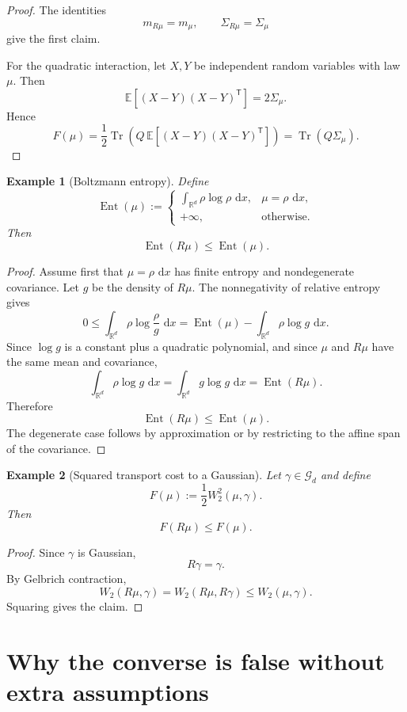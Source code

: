 \documentclass[11pt]{article}
\newtheorem{example}{Example}
\DeclareMathOperator{\Tr}{Tr}
\DeclareMathOperator{\Ent}{Ent}
\newcommand{\R}{\mathbb R}
\newcommand{\W}{W}
\newcommand{\dd}{\,\mathrm d}
\begin{document}
\begin{proof}
The identities
\[
m_{R\mu}=m_\mu,
\qquad
\Sigma_{R\mu}=\Sigma_\mu
\]
give the first claim.

For the quadratic interaction, let $X,Y$ be independent random variables with
law $\mu$. Then
\[
\mathbb E[(X-Y)(X-Y)^{\mathsf T}]=2\Sigma_\mu.
\]
Hence
\[
F(\mu)
=
\frac12\Tr\!\left(Q\,\mathbb E[(X-Y)(X-Y)^{\mathsf T}]\right)
=
\Tr(Q\Sigma_\mu).
\]
\end{proof}

\begin{example}[Boltzmann entropy]
Define
\[
\Ent(\mu)
:=
\begin{cases}
\displaystyle \int_{\R^d}\rho\log\rho\,\dd x,
& \mu=\rho\,\dd x,\\[0.8em]
+\infty,
& \text{otherwise}.
\end{cases}
\]
Then
\[
\Ent(R\mu)\le \Ent(\mu).
\]
\end{example}

\begin{proof}
Assume first that $\mu=\rho\,\dd x$ has finite entropy and nondegenerate
covariance. Let $g$ be the density of $R\mu$. The nonnegativity of relative
entropy gives
\[
0\le
\int_{\R^d}\rho\log\frac{\rho}{g}\,\dd x
=
\Ent(\mu)-\int_{\R^d}\rho\log g\,\dd x.
\]
Since $\log g$ is a constant plus a quadratic polynomial, and since $\mu$ and
$R\mu$ have the same mean and covariance,
\[
\int_{\R^d}\rho\log g\,\dd x
=
\int_{\R^d}g\log g\,\dd x
=
\Ent(R\mu).
\]
Therefore
\[
\Ent(R\mu)\le \Ent(\mu).
\]
The degenerate case follows by approximation or by restricting to the affine
span of the covariance.
\end{proof}

\begin{example}[Squared transport cost to a Gaussian]
Let $\gamma\in\mathcal G_d$ and define
\[
F(\mu):=\frac12\W_2^2(\mu,\gamma).
\]
Then
\[
F(R\mu)\le F(\mu).
\]
\end{example}

\begin{proof}
Since $\gamma$ is Gaussian,
\[
R\gamma=\gamma.
\]
By Gelbrich contraction,
\[
\W_2(R\mu,\gamma)
=
\W_2(R\mu,R\gamma)
\le
\W_2(\mu,\gamma).
\]
Squaring gives the claim.
\end{proof}

\section{Why the converse is false without extra assumptions}
\end{document}
